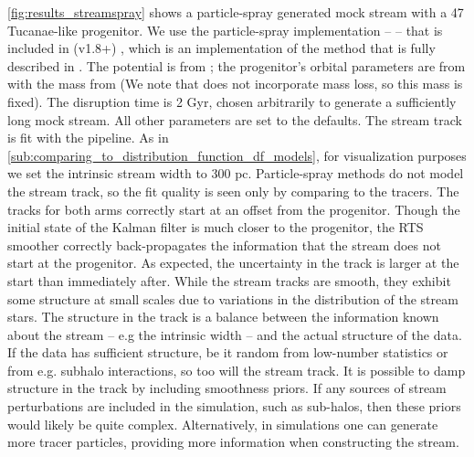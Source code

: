 \documentclass[fleqn,usenatbib]{mnras}
\begin{document}
    \autoref{fig:results_streamspray} shows a particle-spray generated mock
    stream with a 47 Tucanae-like progenitor. We use the particle-spray
    implementation -- \galpystreamspraydf{} -- that is included in \galpy{}
    (v1.8+) \citep{Bovy2015} , which is an implementation of the
    \citet{Fardal2015} method that is fully described in \citet{Qian2022}. The
    potential is \galpyMWPotential{} from \citet{Bovy2014}; the progenitor's
    orbital parameters are from \citet{Vasiliev2019} with the mass from
    \citet{MarksKroupa2010} (We note that \galpystreamspraydf{} does not
    incorporate mass loss, so this mass is fixed). The disruption time is 2 Gyr,
    chosen arbitrarily to generate a sufficiently long mock stream. All other
    parameters are set to the \galpystreamspraydf{} defaults. The stream track
    is fit with the \trackstream{} pipeline. As in
    \autoref{sub:comparing_to_distribution_function_df_models}, for
    visualization purposes we set the intrinsic stream width to 300 pc.
    Particle-spray methods do not model the stream track, so the fit quality is
    seen only by comparing to the tracers. The tracks for both arms correctly
    start at an offset from the progenitor. Though the initial state of the
    Kalman filter is much closer to the progenitor, the RTS smoother correctly
    back-propagates the information that the stream does not start at the
    progenitor. As expected, the uncertainty in the track is larger at the start
    than immediately after. While the stream tracks are smooth, they exhibit
    some structure at small scales due to variations in the distribution of the
    stream stars. The structure in the track is a balance between the
    information known about the stream -- e.g the intrinsic width -- and the
    actual structure of the data. If the data has sufficient structure, be it
    random from low-number statistics or from e.g. subhalo interactions, so too
    will the \trackstream{} stream track. It is possible to damp structure in
    the track by including smoothness priors. If any sources of stream
    perturbations are included in the simulation, such as sub-halos, then these
    priors would likely be quite complex. Alternatively, in simulations one can
    generate more tracer particles, providing more information when constructing
    the stream.
\end{document}
